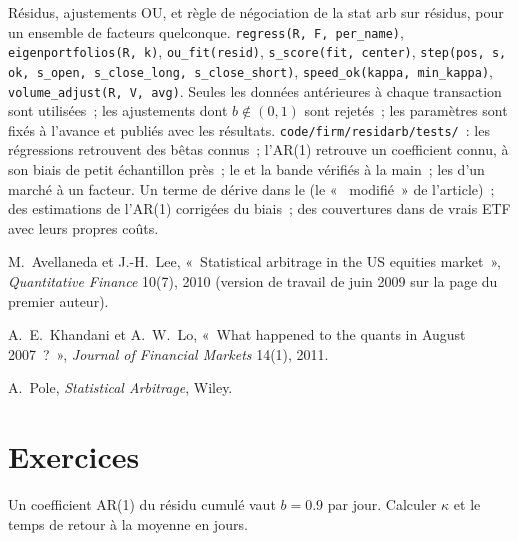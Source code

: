\begin{build}
 Résidus, ajustements OU,  et règle de négociation de la stat arb sur résidus, pour un ensemble de facteurs quelconque.
 \texttt{regress(R, F, per\_name)}, \texttt{eigenportfolios(R, k)}, \texttt{ou\_fit(resid)}, \texttt{s\_score(fit, center)},
\texttt{step(pos, s, ok, s\_open, s\_close\_long, s\_close\_short)}, \texttt{speed\_ok(kappa, min\_kappa)}, \texttt{volume\_adjust(R, V, avg)}.
 Seules les données antérieures à chaque transaction sont utilisées~; les ajustements dont $b \notin (0, 1)$ sont rejetés~; les paramètres sont fixés à l'avance et publiés avec les résultats.
 \texttt{code/firm/residarb/tests/}~: les régressions retrouvent des bêtas connus~; l'AR(1) retrouve un coefficient connu,
à son biais de petit échantillon près~; le  et la bande vérifiés à la main~; les  d'un marché à un facteur.
 Un terme de dérive dans le  (le «~ modifié~» de l'article)~; des estimations de l'AR(1) corrigées du biais~; des couvertures dans de vrais ETF avec leurs propres coûts.
\end{build}

\begin{omsources}
\item M.~Avellaneda et J.-H.~Lee, «~Statistical arbitrage in the US equities market~», \emph{Quantitative Finance} 10(7), 2010 (version de travail de
juin 2009 sur la page du premier auteur).
\item A.~E.~Khandani et A.~W.~Lo, «~What happened to the quants in August 2007~?~», \emph{Journal of Financial Markets} 14(1), 2011.
\item A.~Pole, \emph{Statistical Arbitrage}, Wiley.
\end{omsources}

\section{Exercices}

\begin{exercise}[$\star$]\label{exo:s1:residual-and-principal-component-stat-arb:1}
Un coefficient AR(1) du résidu cumulé vaut $b = 0.9$ par jour. Calculer $\kappa$ et le temps de retour à la moyenne en jours.
\end{exercise}

